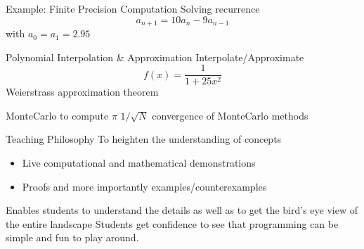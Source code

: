 \documentclass{beamer}
\begin{document}
\begin{frame}{Example: Finite Precision Computation}
	\LARGE
	Solving recurrence
	$$a_{n+1} = 10a_n - 9a_{n-1}$$
	with $a_0 = a_1 = 2.95$
\end{frame}

\begin{frame}{Polynomial Interpolation \& Approximation}
	\LARGE
	Interpolate/Approximate
	$$f(x) = \dfrac1{1+25x^2}$$
	Weierstrass approximation theorem
\end{frame}

\begin{frame}{MonteCarlo to compute $\pi$}
	\LARGE
	$1/\sqrt{N}$ convergence of MonteCarlo methods
\end{frame}

\begin{frame}{Teaching Philosophy}
	\LARGE
	To heighten the understanding of concepts
	\begin{itemize}
		\item
		Live computational and mathematical demonstrations
		\item
		Proofs and more importantly examples/counterexamples
	\end{itemize}
	Enables students to understand the details as well as to get the bird's eye view of the entire landscape
	Students get confidence to see that programming can be simple and fun to play around.
\end{frame}
\end{document}
